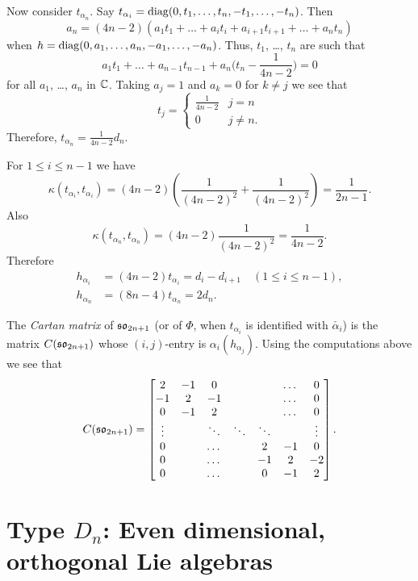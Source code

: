 Now consider $t_{\alpha_n}$. Say $t_{\alpha_i}= {\operatorname{diag}(0,t_1,\dots,t_n,
  -t_1,\dots,-t_n)}$. Then
\begin{equation*}
  a_n= (4n-2)(a_1t_1+\dots+a_it_i+a_{i+1}t_{i+1}+ \dots +a_nt_n)
\end{equation*}
when $h={\operatorname{diag}(0,a_1,\dots,a_n, -a_1,\dots,-a_n)}$. Thus, $t_1$, \dots, $t_n$ are such that
\begin{equation*}
  \textstyle  a_1t_1+\dots+a_{n-1} t_{n-1} +a_n\big(t_n-\frac 1{4n-2}\big)=0 
\end{equation*}
for all $a_1$, \dots, $a_n$ in ${\mathbb C}$. Taking $a_j=1$ and $a_k=0$ for $k\ne
j$ we see that
\[
t_j= \begin{cases} \textstyle \frac 1{4n-2}&j=n \\ 0 &j\ne n. \end{cases}
\]
Therefore, $t_{\alpha_n}=\frac 1{4n-2} d_n$.

For $1\leq i\leq n-1$ we have
\[
\kappa(t_{\alpha_i}, t_{\alpha_i})= (4n-2) \left(\textstyle \frac
  1{(4n-2)^2} + \frac 1{(4n-2)^2}\right) = \frac 1{2n-1}.
\]
Also
\[
\kappa(t_{\alpha_n}, t_{\alpha_n})= (4n-2) \frac 1{(4n-2)^2} = \frac
1{4n-2}.
\]
Therefore
\begin{align*}
  h_{\alpha_i}&= (4n-2) t_{\alpha_i}= d_i-d_{i+1} \quad (1\leq i\leq n-1),\\
  h_{\alpha_n}&= (8n-4)t_{\alpha_n} = 2d_n.
\end{align*}

The \emph{Cartan matrix} of $\mathfrak {so}_{2n+1}$ (or of $\Phi$, when $t_{\alpha_i}$
is identified with $\check{\alpha_i}$) is the matrix $C(\mathfrak {so}_{2n+1})$ whose
$(i,j)$-entry is $\alpha_i(h_{\alpha_j})$. Using the computations above we
see that
\[
C(\mathfrak {so}_{2n+1})= 
\begin{bmatrix}
  2&-1&0&&&\dots&0 \\
  -1&2&-1&&&\dots&0 \\
  0&-1&2&&&\dots&0 \\  \vdots&&\ddots&\ddots&\ddots&&\vdots\\
  0&&\dots&&2&-1&0 \\
  0&&\dots&&-1&2&-2 \\
  0&&\dots&&0&-1&2
\end{bmatrix}.
\]


\section{Type \texorpdfstring{$D_n$}{Dn}: Even dimensional, orthogonal Lie
  algebras} 




